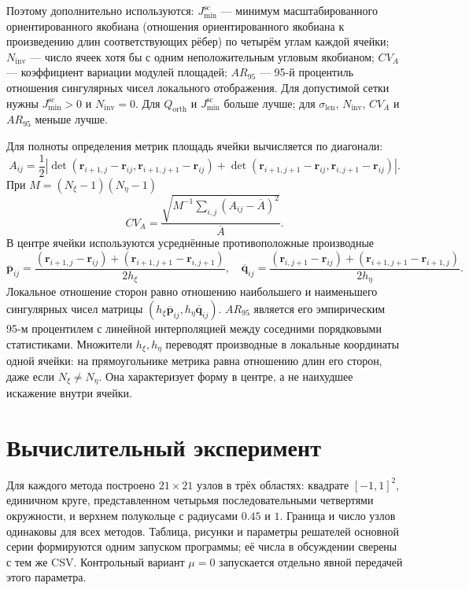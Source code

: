 \documentclass[11pt,a4paper]{article}
\newcommand{\vect}[1]{\boldsymbol{#1}}
\newcommand{\Jsc}{J_{\min}^{\mathrm{sc}}}
\begin{document}
Поэтому дополнительно используются:
\(\Jsc\) --- минимум масштабированного ориентированного якобиана
(отношения ориентированного якобиана к произведению длин соответствующих
рёбер) по четырём углам каждой ячейки;
\(N_{\mathrm{inv}}\) --- число ячеек хотя бы с одним неположительным
угловым якобианом; \(CV_A\) --- коэффициент вариации модулей площадей;
\(AR_{95}\) --- 95-й процентиль отношения сингулярных чисел локального
отображения. Для допустимой сетки нужны \(\Jsc>0\) и
\(N_{\mathrm{inv}}=0\). Для \(Q_{\mathrm{orth}}\) и \(\Jsc\) больше
лучше; для \(\sigma_{\mathrm{len}}\), \(N_{\mathrm{inv}}\), \(CV_A\) и
\(AR_{95}\) меньше лучше.

Для полноты определения метрик площадь ячейки вычисляется по диагонали:
\[
A_{ij}=\frac12\left|
\det(\vect r_{i+1,j}-\vect r_{ij},\vect r_{i+1,j+1}-\vect r_{ij})
+\det(\vect r_{i+1,j+1}-\vect r_{ij},\vect r_{i,j+1}-\vect r_{ij})
\right|.
\]
При \(M=(N_\xi-1)(N_\eta-1)\)
\[
CV_A=\frac{\sqrt{M^{-1}\sum_{i,j}(A_{ij}-\overline A)^2}}
{\overline A}.
\]
В центре ячейки используются усреднённые противоположные производные
\[
\overline{\vect p}_{ij}=
\frac{(\vect r_{i+1,j}-\vect r_{ij})
+(\vect r_{i+1,j+1}-\vect r_{i,j+1})}{2h_\xi},
\quad
\overline{\vect q}_{ij}=
\frac{(\vect r_{i,j+1}-\vect r_{ij})
+(\vect r_{i+1,j+1}-\vect r_{i+1,j})}{2h_\eta}.
\]
Локальное отношение сторон равно отношению наибольшего и наименьшего
сингулярных чисел матрицы
\((h_\xi\overline{\vect p}_{ij},h_\eta\overline{\vect q}_{ij})\).
\(AR_{95}\) является его эмпирическим 95-м процентилем с линейной
интерполяцией между соседними порядковыми статистиками. Множители $h_\xi,h_\eta$
переводят производные в локальные координаты одной ячейки: на прямоугольнике
метрика равна отношению длин его сторон, даже если $N_\xi\ne N_\eta$.
Она характеризует форму в центре, а не наихудшее искажение внутри ячейки.

\section{Вычислительный эксперимент}

Для каждого метода построено \(21\times21\) узлов в трёх областях:
квадрате \([-1,1]^2\), единичном круге, представленном четырьмя
последовательными четвертями окружности, и верхнем полукольце с радиусами
\(0.45\) и \(1\). Граница и число узлов одинаковы для всех методов.
Таблица, рисунки и параметры решателей основной серии формируются одним
запуском программы; её числа в обсуждении сверены с тем же CSV.
Контрольный вариант \(\mu=0\) запускается отдельно явной передачей этого
параметра.
\end{document}

